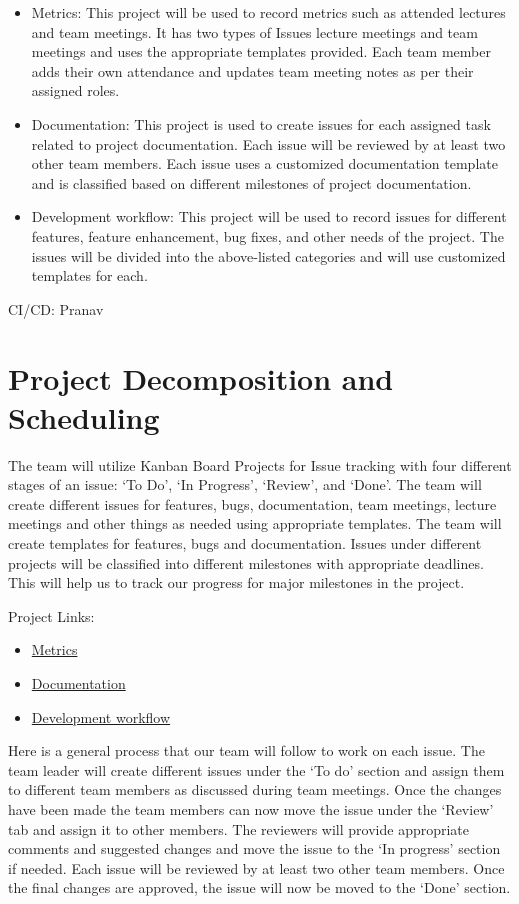 \documentclass{article}
\begin{document}
\begin{itemize}
\item Metrics: This project will be used to record metrics such as attended lectures and team meetings. It has two types of Issues lecture meetings and team meetings and uses the appropriate templates provided. Each team member adds their own attendance and updates team meeting notes as per their assigned roles.
\item Documentation: This project is used to create issues for each assigned task related to project documentation. Each issue will be reviewed by at least two other team members. Each issue uses a customized documentation template and is classified based on different milestones of project documentation. 
\item Development workflow: This project will be used to record issues for different features, feature enhancement, bug fixes, and other needs of the project. The issues will be divided into the above-listed categories and will use customized templates for each. 
\end{itemize}

CI/CD: Pranav

\section{Project Decomposition and Scheduling}

The team will utilize Kanban Board Projects for Issue tracking with four different stages of an issue: ‘To Do’, ‘In Progress’, ‘Review’, and ‘Done’. The team will create different issues for features, bugs, documentation, team meetings, lecture meetings and other things as needed using appropriate templates. The team will create templates for features, bugs and documentation. Issues under different projects will be classified into different milestones with appropriate deadlines. This will help us to track our progress for major milestones in the project. 

Project Links:
\begin{itemize}
\item  
\href{https://github.com/users/Inreet-Kaur/projects/4}{Metrics}
\item  
\href{https://github.com/users/Inreet-Kaur/projects/2}{Documentation} 
\item 
\href{https://github.com/users/Inreet-Kaur/projects/6}{Development workflow}
\end{itemize}

Here is a general process that our team will follow to work on each issue. The team leader will create different issues under the ‘To do’ section and assign them to different team members as discussed during team meetings. Once the changes have been made the team members can now move the issue under the ‘Review’ tab and assign it to other members. The reviewers will provide appropriate comments and suggested changes and move the issue to the ‘In progress’ section if needed. Each issue will be reviewed by at least two other team members. Once the final changes are approved, the issue will now be moved to the ‘Done’ section. 
\end{document}
